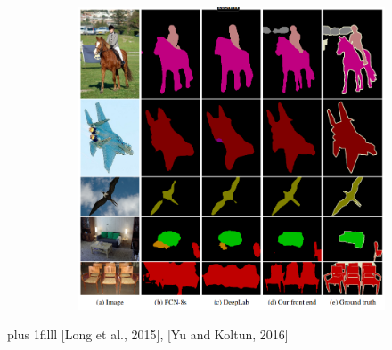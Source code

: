 \documentclass{beamer}
\newcommand{\source}[1]{\vskip0pt plus 1filll \scriptsize #1}
\begin{document}
\begin{frame}
\begin{figure}
\begin{subfigure}{0.5\textwidth}
				\includegraphics[width=\textwidth]{plots/segmentationComparison.png}
			\end{subfigure}
		\end{figure}
		\source{[Long et al., 2015], [Yu and Koltun, 2016]}
	\end{frame}
\end{document}
